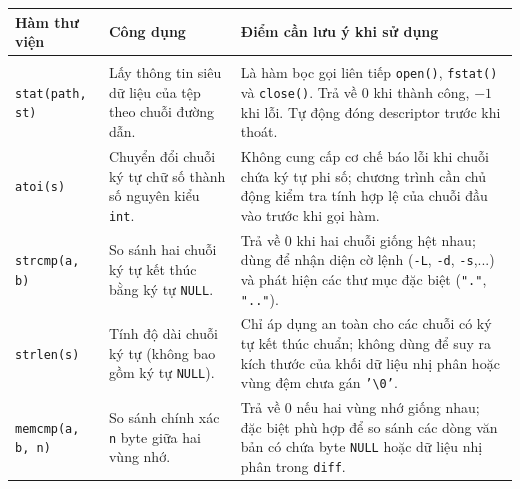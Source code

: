 \documentclass[12pt,a4paper]{article}
\begin{document}
\begin{minipage}{\textwidth}
\small
\renewcommand{\arraystretch}{1.2}
\setlength{\parskip}{0pt}
\begin{tabularx}{\textwidth}{@{}>{\raggedright\arraybackslash}p{}
  >{\raggedright\arraybackslash}p{}
  >{\raggedright\arraybackslash}X@{}}
\toprule
\rowcolor{tableheader}
\textbf{Hàm thư viện} & \textbf{Công dụng} & \textbf{Điểm cần lưu ý khi sử dụng} \\
\midrule
\multicolumn{3}{@{}l@{}}{\textbf{Thao tác đường dẫn, chuỗi ký tự và dữ liệu}} \\
\midrule
\texttt{stat(path, st)} &
Lấy thông tin siêu dữ liệu của tệp theo chuỗi đường dẫn. &
Là hàm bọc gọi liên tiếp \texttt{open()}, \texttt{fstat()} và \texttt{close()}. Trả về $0$ khi thành công, $-1$ khi lỗi. Tự động đóng descriptor trước khi thoát. \\
\texttt{atoi(s)} &
Chuyển đổi chuỗi ký tự chữ số thành số nguyên kiểu \texttt{int}. &
Không cung cấp cơ chế báo lỗi khi chuỗi chứa ký tự phi số; chương trình cần chủ động kiểm tra tính hợp lệ của chuỗi đầu vào trước khi gọi hàm. \\
\texttt{strcmp(a, b)} &
So sánh hai chuỗi ký tự kết thúc bằng ký tự \texttt{NULL}. &
Trả về $0$ khi hai chuỗi giống hệt nhau; dùng để nhận diện cờ lệnh (\texttt{-L}, \texttt{-d}, \texttt{-s},...) và phát hiện các thư mục đặc biệt (\texttt{"."}, \texttt{".."}). \\
\texttt{strlen(s)} &
Tính độ dài chuỗi ký tự (không bao gồm ký tự \texttt{NULL}). &
Chỉ áp dụng an toàn cho các chuỗi có ký tự kết thúc chuẩn; không dùng để suy ra kích thước của khối dữ liệu nhị phân hoặc vùng đệm chưa gán \texttt{'\textbackslash 0'}. \\
\texttt{memcmp(a, b, n)} &
So sánh chính xác \texttt{n} byte giữa hai vùng nhớ. &
Trả về $0$ nếu hai vùng nhớ giống nhau; đặc biệt phù hợp để so sánh các dòng văn bản có chứa byte \texttt{NULL} hoặc dữ liệu nhị phân trong \texttt{diff}. \\
\bottomrule
\end{tabularx}
\end{minipage}

\newpage
\end{document}
